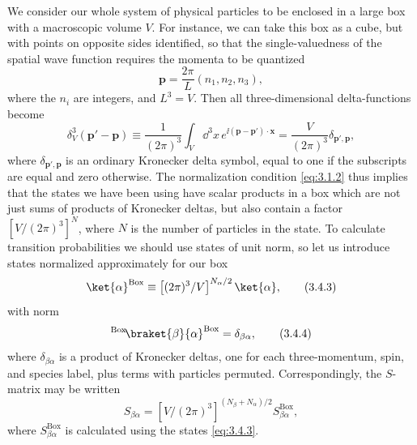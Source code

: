 We consider our whole system of physical particles to be enclosed in a large box with a
macroscopic volume $V$. For instance, we can take this box as a cube, but with points on
opposite sides identified, so that the single-valuedness of the spatial wave function requires
the momenta to be quantized
\begin{equation}
 \mathbf{p}=\frac{2\pi}{L}(n_1,n_2,n_3),
 \tag{3.4.1}\label{eq:3.4.1}
\end{equation}
where the $n_i$ are integers, and $L^3=V$. Then all three-dimensional delta-functions become
\begin{equation}
 \delta_V^3(\mathbf{p}'-\mathbf{p})\equiv
 \frac{1}{(2\pi)^3}\int_V \dd^3x\,e^{\ii(\mathbf{p}-\mathbf{p}')\cdot\mathbf{x}}
 =\frac{V}{(2\pi)^3}\delta_{\mathbf{p}',\mathbf{p}},
 \tag{3.4.2}\label{eq:3.4.2}
\end{equation}
where $\delta_{\mathbf{p}',\mathbf{p}}$ is an ordinary Kronecker delta symbol, equal to one if the
subscripts are equal and zero otherwise. The normalization condition \eqref{eq:3.1.2} thus implies
that the states we have been using have scalar products in a box which are not just sums of
products of Kronecker deltas, but also contain a factor $[V/(2\pi)^3]^N$, where $N$ is the
number of particles in the state. To calculate transition probabilities we should use states
of unit norm, so let us introduce states normalized approximately for our box
\begin{equation}
 \ket{\alpha}^{\mathrm{Box}}\equiv
 \left[(2\pi)^3/V\right]^{N_\alpha/2}\ket{\alpha},
 \tag{3.4.3}\label{eq:3.4.3}
\end{equation}
with norm
\begin{equation}
 {}^{\mathrm{Box}}\!\braket{\beta}{\alpha}^{\mathrm{Box}}=\delta_{\beta\alpha},
 \tag{3.4.4}\label{eq:3.4.4}
\end{equation}
where $\delta_{\beta\alpha}$ is a product of Kronecker deltas, one for each three-momentum,
spin, and species label, plus terms with particles permuted. Correspondingly, the $S$-matrix
may be written
\begin{equation}
 S_{\beta\alpha}=\left[V/(2\pi)^3\right]^{(N_\beta+N_\alpha)/2}
 S^{\mathrm{Box}}_{\beta\alpha},
 \tag{3.4.5}\label{eq:3.4.5}
\end{equation}
where $S^{\mathrm{Box}}_{\beta\alpha}$ is calculated using the states \eqref{eq:3.4.3}.

